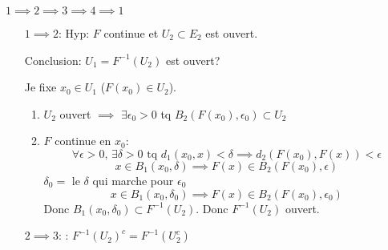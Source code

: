 \begin{preuve}
   $1 \implies 2 \implies 3 \implies 4 \implies 1$ 
   \begin{itemize}
       \item[$1 \implies 2$:] Hyp: $F$ continue et  $U_2 \subset E_2$ est ouvert.
           \par
           Conclusion: $U_1 = F^{-1}(U_2)$ est ouvert?
           \par
           Je fixe $x_0 \in U_1$ ($F(x_0) \in U_2$).
           \begin{enumerate}
               \item $U_2$ ouvert $\implies$ $\exists \epsilon_0 > 0$ tq $B_2(F(x_0), \epsilon_0) \subset U_2$
               \item $F$ continue en  $x_0$: 
                   \[
                   \forall \epsilon > 0, \, \exists \delta > 0 \text{ tq } d_1(x_0, x) < \delta \implies d_2(F(x_0), F(x)) < \epsilon
                   \] 
                   \[
                   x \in B_1(x_0, \delta) \implies F(x) \in B_2(F(x_0), \epsilon)
                   \] 
                   $\delta_0 = $ le  $\delta$ qui marche pour  $\epsilon_0$
                    \[
                   x \in B_1(x_0, \delta_0) \implies F(x) \in B_2(F(x_0), \epsilon_0)
                   \] 
                   Donc $B_1(x_0, \delta_0) \subset F^{-1}(U_2)$. Donc $F^{-1}(U_2)$ ouvert.
           \end{enumerate}
       \item[$2 \implies 3$:]: $F^{-1}(U_2)^{c} = F^{-1}(U_2^c)$
   \end{itemize}
\end{preuve}

